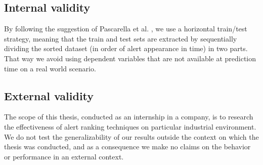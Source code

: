 \subsection{Internal validity}

By following the suggestion of Pascarella et al. \cite{performance_method_bug}, we use a horizontal train/test strategy, meaning that the train and test sets are extracted by sequentially dividing the sorted dataset (in order of alert appearance in time) in two parts. That way we avoid using dependent variables that are not available at prediction time on a real world scenario.


\subsection{External validity}
The scope of this thesis, conducted as an internship in a company, is to research the effectiveness of alert ranking techniques on particular industrial environment. We do not test the generalizability of our results outside the context on which the thesis was conducted, and as a consequence we make no claims on the behavior or performance in an external context.
